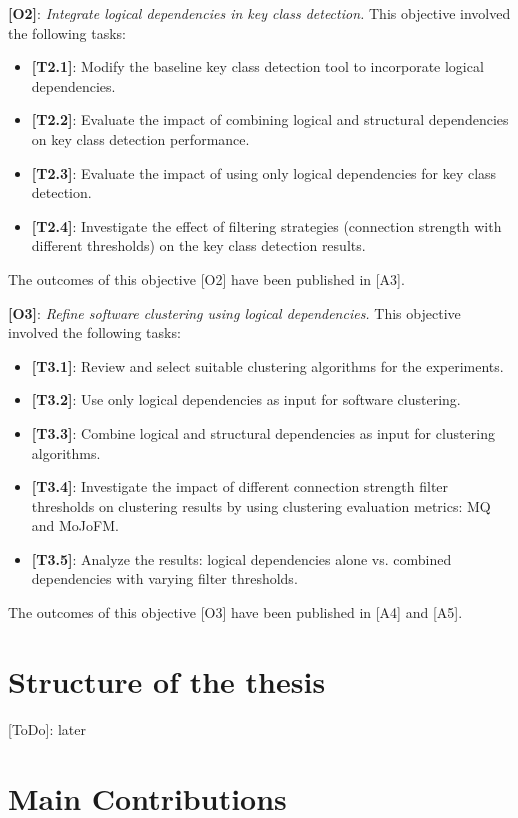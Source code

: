 \textbf{[O2]}: \textit{Integrate logical dependencies in key class detection.}
This objective involved the following tasks:
\begin{itemize}
\item \textbf{[T2.1]}: Modify the baseline key class detection tool to incorporate logical dependencies.
\item \textbf{[T2.2]}: Evaluate the impact of combining logical and structural dependencies on key class detection performance.
\item \textbf{[T2.3]}: Evaluate the impact of using only logical dependencies for key class detection.
\item \textbf{[T2.4]}: Investigate the effect of filtering strategies (connection strength with different thresholds) on the key class detection results.
\end{itemize}
The outcomes of this objective [O2] have been published in [A3].

\textbf{[O3]}: \textit{Refine software clustering using logical dependencies.}
This objective involved the following tasks:
\begin{itemize}
\item \textbf{[T3.1]}: Review and select suitable clustering algorithms for the experiments.
\item \textbf{[T3.2]}: Use only logical dependencies as input for software clustering.
\item \textbf{[T3.3]}: Combine logical and structural dependencies as input for clustering algorithms.
\item \textbf{[T3.4]}: Investigate the impact of different connection strength filter thresholds on clustering results by using clustering evaluation metrics: MQ and MoJoFM.
\item \textbf{[T3.5]}: Analyze the results: logical dependencies alone vs. combined dependencies with varying filter thresholds.
\end{itemize}
The outcomes of this objective [O3] have been published in [A4] and [A5].

\section{Structure of the thesis}
[ToDo]: later

\section{Main Contributions}

